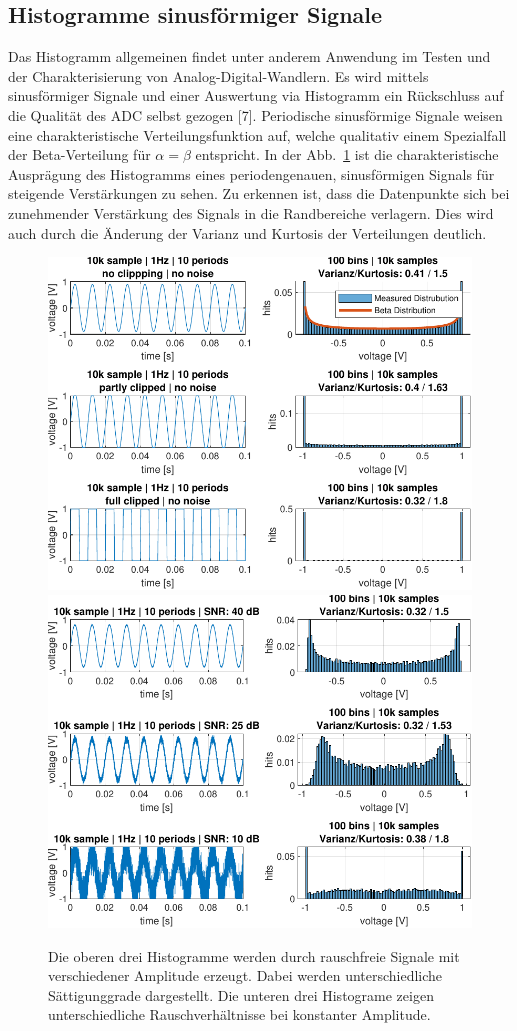 \subsection{Histogramme sinusförmiger Signale }
Das Histogramm allgemeinen findet unter anderem Anwendung im Testen und der Charakterisierung von Analog-Digital-Wandlern. Es wird mittels sinusförmiger Signale und einer Auswertung via Histogramm ein Rückschluss auf die Qualität des ADC selbst gezogen [7]. Periodische sinusförmige Signale weisen eine charakteristische Verteilungsfunktion auf, welche qualitativ einem Spezialfall der Beta-Verteilung für $\alpha = \beta$ entspricht. In der Abb.~\ref{fig:Histogramm-Gain} ist die charakteristische Ausprägung des Histogramms eines periodengenauen, sinusförmigen Signals für steigende Verstärkungen zu sehen. Zu erkennen ist, dass die Datenpunkte sich bei zunehmender Verstärkung des Signals in die Randbereiche verlagern. Dies wird auch durch die Änderung der Varianz und Kurtosis der Verteilungen deutlich.
\begin{figure}[h!] 
	\centering 
	\includegraphics[width=.9\textwidth]{../img/beta-distribution.pdf}
	\includegraphics[width=.9\textwidth]{../img/noise-histogramm.pdf}
	\caption{Die oberen drei Histogramme werden durch rauschfreie Signale mit verschiedener Amplitude erzeugt. Dabei werden unterschiedliche Sättigunggrade dargestellt. Die unteren drei Histograme zeigen unterschiedliche Rauschverhältnisse bei konstanter Amplitude.}
	\label{fig:Histogramm-Gain}
\end{figure} 
